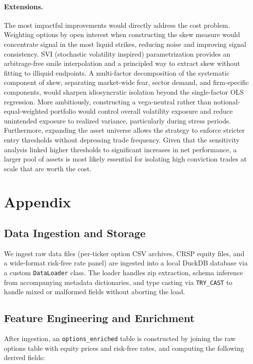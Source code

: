 \documentclass[12pt, a4paper]{article}
\begin{document}
\paragraph{Extensions.}
The most impactful improvements would directly address the cost problem. Weighting options by open interest when constructing the skew measure would concentrate signal in the most liquid strikes, reducing noise and improving signal consistency. SVI (stochastic volatility inspired) parametrization \cite{gatheral2013} provides an arbitrage-free smile interpolation and a principled way to extract skew without fitting to illiquid endpoints. A multi-factor decomposition of the systematic component of skew, separating market-wide fear, sector demand, and firm-specific components, would sharpen idiosyncratic isolation beyond the single-factor OLS regression. More ambitiously, constructing a vega-neutral rather than notional-equal-weighted portfolio would control overall volatility exposure and reduce unintended exposure to realized variance, particularly during stress periods. Furthermore, expanding the asset universe allows the strategy to enforce stricter entry thresholds without depressing trade frequency. Given that the sensitivity analysis linked higher thresholds to significant increases in net performance, a larger pool of assets is most likely essential for isolating high conviction trades at scale that are worth the cost.


\newpage



 



\newpage
\appendix
\section{Appendix}
\label{sec:data_app}
\subsection*{Data Ingestion and Storage}
We ingest raw data files (per-ticker option CSV archives, CRSP equity files, and a wide-format risk-free rate panel) are ingested into a local DuckDB database via a custom \texttt{DataLoader} class. The loader handles zip extraction, schema inference from accompanying metadata dictionaries, and type casting via \texttt{TRY\_CAST} to handle mixed or malformed fields without aborting the load.

\subsection*{Feature Engineering and Enrichment}
After ingestion, an \texttt{options\_enriched} table is constructed by joining the raw options table with equity prices and risk-free rates, and computing the following derived fields:
\end{document}
